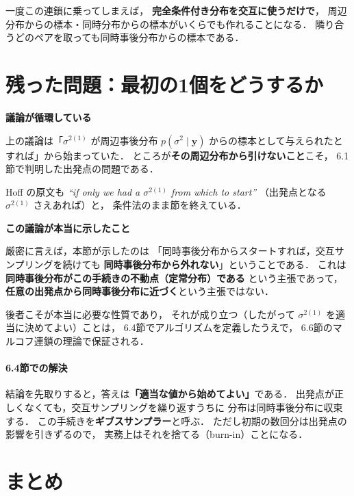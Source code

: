 \documentclass[lualatex,ja=standard,a4paper,12pt]{bxjsarticle}
\begin{document}
\noindent 一度この連鎖に乗ってしまえば，
\textbf{完全条件付き分布を交互に使うだけで}，
周辺分布からの標本・同時分布からの標本がいくらでも作れることになる．
隣り合うどのペアを取っても同時事後分布からの標本である．

\section{残った問題：最初の1個をどうするか}

\begin{warningbox}
\textbf{議論が循環している}

上の議論は「$\sigma^{2(1)}$ が周辺事後分布 $p(\sigma^2 \mid \boldsymbol{y})$
からの標本として与えられたとすれば」から始まっていた．
ところが\textbf{その周辺分布から引けないこと}こそ，
6.1節で判明した出発点の問題である．

\medskip
Hoff の原文も
\textit{``if only we had a $\sigma^{2(1)}$ from which to start''}
（出発点となる $\sigma^{2(1)}$ さえあれば）と，
条件法のまま節を終えている．
\end{warningbox}

\begin{pointbox}
\textbf{この議論が本当に示したこと}

厳密に言えば，本節が示したのは
「同時事後分布からスタートすれば，交互サンプリングを続けても
\textbf{同時事後分布から外れない}」ということである．
これは\textbf{同時事後分布がこの手続きの不動点（定常分布）である}
という主張であって，
\textbf{任意の出発点から同時事後分布に近づく}という主張ではない．

\medskip
後者こそが本当に必要な性質であり，
それが成り立つ（したがって $\sigma^{2(1)}$ を適当に決めてよい）ことは，
6.4節でアルゴリズムを定義したうえで，
6.6節のマルコフ連鎖の理論で保証される．
\end{pointbox}

\paragraph{6.4節での解決}
結論を先取りすると，答えは\textbf{「適当な値から始めてよい」}である．
出発点が正しくなくても，交互サンプリングを繰り返すうちに
分布は同時事後分布に収束する．
この手続きを\textbf{ギブスサンプラー}と呼ぶ．
ただし初期の数回分は出発点の影響を引きずるので，
実務上はそれを捨てる（burn-in）ことになる．

\section{まとめ}
\end{document}
